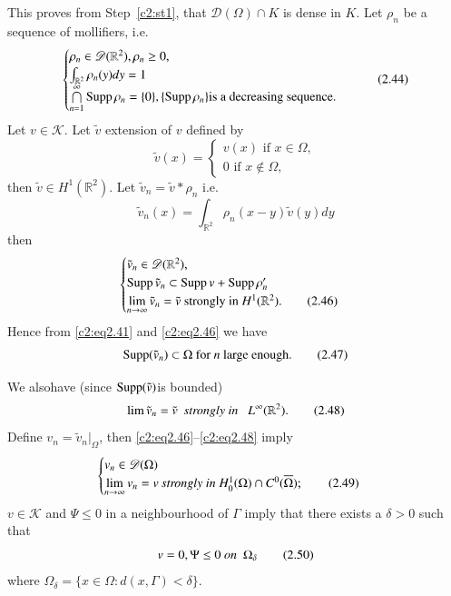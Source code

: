 This proves from Step~\ref{c2:st1}, that $\mathscr{D}(\Omega) \cap K$ is dense in
$K$. Let $\rho_n$ be a sequence of mollifiers, i.e. 
\begin{equation}
\begin{cases}
\rho_n \in \mathscr{D} (\mathbb{R}^2), \rho_n \geq 0,\\
\int_{\mathbb{R}^2} \rho_n (y) dy = 1\\
\bigcap\limits^{\infty}_{n=1} \operatorname{Supp} \rho_n = \{0 \}, \{\operatorname{Supp} \rho_n \}
\text{is a decreasing sequence}. 
\end{cases}\tag{2.44}\label{c2:eq2.44}
\end{equation} 
Let $v \in \mathscr{K}$. Let $\tilde{v}$ extension of $v$ defined
by  
$$
\tilde{v}(x)=
\begin{cases} 
v (x) \text{ if } x \in \Omega,\\
0 \text{ if } x \notin \Omega,
\end{cases}
$$  
then $\tilde{v} \in H^1 (\mathbb{R}^2)$. Let $\tilde{v}_n =
\tilde{v} * \rho_n$ i.e. 
\begin{equation}
\tilde{v}_n (x) = \int_{\mathbb{R}^2} \rho_n (x - y) \tilde{v} (y) dy
\tag{2.45}\label{c2:eq2.45} 
\end{equation} 
then 
\begin{equation}
\begin{cases}
\tilde{v}_n \in \mathscr{D} (\mathbb{R}^2),\\
\operatorname{Supp} \tilde{v}_n \subset \operatorname{Supp} v + \operatorname{Supp} \rho_n'\\
\lim\limits_{n \to \infty} \tilde{v}_n = \tilde{v} \text{ strongly  in
}H^1 (\mathbb{R}^2). \tag{2.46}\label{c2:eq2.46}  
\end{cases}
\end{equation}
Hence from \eqref{c2:eq2.41} and \eqref{c2:eq2.46} we have   
\begin{equation}
\operatorname{Supp} (\tilde{v}_n) \subset \Omega \text{ for $n$ large
  enough}. \tag{2.47}\label{c2:eq2.47} 
\end{equation}

We also\pageoriginale  have (since $\operatorname{Supp} (\tilde{v})$is bounded) 
\begin{equation}
\lim \tilde{v}_n = \tilde{v} ~~\text{\em strongly in }~~L^\infty
(\mathbb{R}^2).\tag{2.48}\label{c2:eq2.48} 
\end{equation}
Define $v_n = \tilde{v}_n |_\Omega$, then 
\eqref{c2:eq2.46}--\eqref{c2:eq2.48} imply
\begin{equation}
\begin{cases}
v_n \in \mathscr{D}(\Omega)\\
\lim\limits_{n \to \infty } v_n  = v ~\text{\em strongly in}~ H^1_0 (\Omega)
\cap C^0 (\overline{\Omega}); \tag{2.49}\label{c2:eq2.49}   
\end{cases}
\end{equation}
$v \in \mathscr{K}$ and $\Psi \leq 0$ in a neighbourhood of
$\Gamma$ imply that there exists a $\delta > 0$ such that  
\begin{equation}
v = 0, \Psi \leq 0 ~\text{\em on }~ \Omega_\delta
\tag{2.50}\label{c2:eq2.50} 
\end{equation}
where $\Omega_\delta = \{x \in \Omega : d(x, \Gamma) < \delta \}$.

